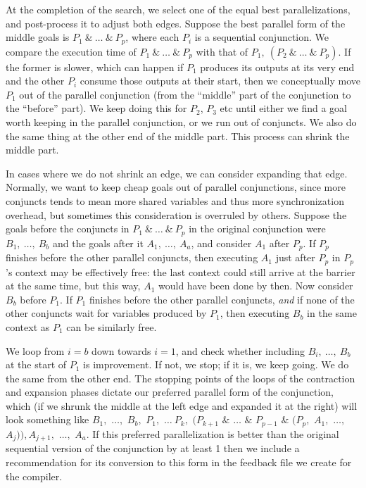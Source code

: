 \noindent
At the completion of the search,
we select one of the equal best parallelizations,
and post-process it to adjust both edges.
Suppose the best parallel form of the middle goals is $P_1~\&~\ldots~\&~P_p$,
where each $P_i$ is a sequential conjunction.
We compare the execution time of $P_1~\&~\ldots~\&~P_p$
with that of $P_1,~(P_2~\&~\ldots~\&~P_p)$.
If the former is slower,
which can happen if $P_1$ produces its outputs at its very end
and the other $P_i$ consume those outputs at their start,
then we conceptually move $P_1$ out of the parallel conjunction
(from the ``middle'' part of the conjunction to the ``before'' part).
We keep doing this for $P_2$, $P_3$ etc until either
we find a goal worth keeping in the parallel conjunction,
or we run out of conjuncts.
We also do the same thing at the other end of the middle part.
This process can shrink the middle part.

In cases where we do not shrink an edge, we can consider expanding that edge.
Normally, we want to keep cheap goals out of parallel conjunctions,
since more conjuncts tends to mean
more shared variables and thus more synchronization overhead,
but sometimes this consideration is overruled by others.
Suppose the goals before the conjuncts in $P_1~\&~\ldots~\&~P_p$
in the original conjunction were $B_1,~\ldots,~B_b$
and the goals after it $A_1,~\ldots,~A_a$,
and consider $A_1$ after $P_p$.
If $P_p$ finishes before the other parallel conjuncts,
then executing $A_1$ just after $P_p$ in $P_p$'s context
may be effectively free:
the last context could still arrive at the barrier at the same time,
but this way, $A_1$ would have been done by then.
Now consider $B_b$ before $P_1$.
If $P_1$ finishes before the other parallel conjuncts,
\emph{and} if none of the other conjuncts wait for variables produced by $P_1$,
then executing $B_b$ in the same context as $P_1$ can be similarly free.

We loop from $i=b$ down towards $i=1$, and check whether
including $B_i,~\ldots,~B_b$ at the start of $P_1$ is improvement.
If not, we stop; if it is, we keep going.
We do the same from the other end.
The stopping points of the loops of the contraction and expansion phases
dictate our preferred parallel form of the conjunction, which
(if we shrunk the middle at the left edge and expanded it at the right)
will look something like
$B_1,$ $\ldots,$ $B_{b},$ $P_1,$ $\ldots~P_k,$
$(P_{k+1}$ $\&$ $\ldots$ $\&$ $P_{p-1}$ $\&$ $(P_p,$ $A_1,$ $\ldots,$ $A_j)),
A_{j+1},$ $\ldots,$ $A_a$.
If this preferred parallelization is better than
the original sequential version of the conjunction by at least 1%
then we include a recommendation for its conversion to this form
in the feedback file we create for the compiler.

